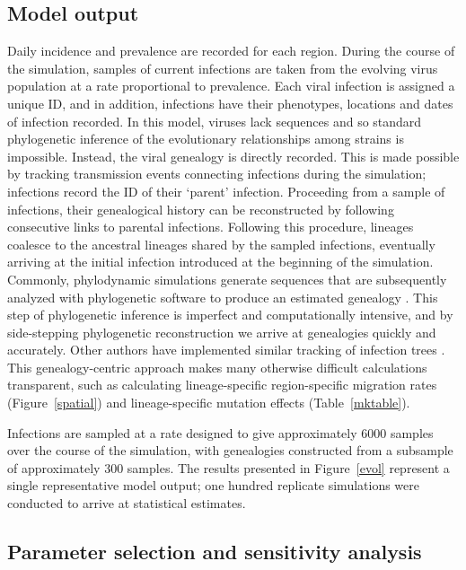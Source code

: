 \documentclass[11pt,oneside,letterpaper]{article}
\begin{document}
\subsection*{Model output}

Daily incidence and prevalence are recorded for each region.  During the course of the simulation, samples of current infections are taken from the evolving virus population at a rate proportional to prevalence.  Each viral infection is assigned a unique ID, and in addition, infections have their phenotypes, locations and dates of infection recorded.  In this model, viruses lack sequences and so standard phylogenetic inference of the evolutionary relationships among strains is impossible.  Instead, the viral genealogy is directly recorded.  This is made possible by tracking transmission events connecting infections during the simulation; infections record the ID of their `parent' infection.  Proceeding from a sample of infections, their genealogical history can be reconstructed by following consecutive links to parental infections.  Following this procedure, lineages coalesce to the ancestral lineages shared by the sampled infections, eventually arriving at the initial infection introduced at the beginning of the simulation.  Commonly, phylodynamic simulations generate sequences that are subsequently analyzed with phylogenetic software to produce an estimated genealogy \cite{Ferguson03,Koelle06,Koelle10}.  This step of phylogenetic inference is imperfect and computationally intensive, and by side-stepping phylogenetic reconstruction we arrive at genealogies quickly and accurately.  Other authors have implemented similar tracking of infection trees \cite{Volz09,Odea11}.  This genealogy-centric approach makes many otherwise difficult calculations transparent, such as calculating lineage-specific region-specific migration rates (Figure~\ref{spatial}) and lineage-specific mutation effects (Table~\ref{mktable}).

Infections are sampled at a rate designed to give approximately 6000 samples over the course of the simulation, with genealogies constructed from a subsample of approximately 300 samples.  The results presented in Figure~\ref{evol} represent a single representative model output; one hundred replicate simulations were conducted to arrive at statistical estimates. 

\subsection*{Parameter selection and sensitivity analysis}
\end{document}
